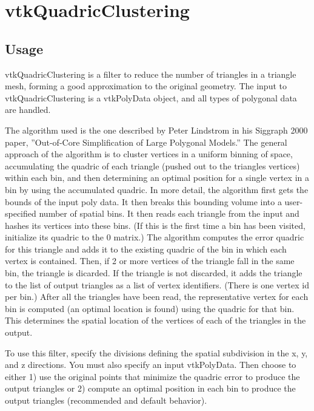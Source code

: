 \section{vtkQuadricClustering}

\subsection{Usage}

 vtkQuadricClustering is a filter to reduce the number of triangles in a
 triangle mesh, forming a good approximation to the original geometry.  The
 input to vtkQuadricClustering is a vtkPolyData object, and all types of
 polygonal data are handled.

 The algorithm used is the one described by Peter Lindstrom in his Siggraph
 2000 paper, ''Out-of-Core Simplification of Large Polygonal Models.''  The
 general approach of the algorithm is to cluster vertices in a uniform
 binning of space, accumulating the quadric of each triangle (pushed out to
 the triangles vertices) within each bin, and then determining an optimal
 position for a single vertex in a bin by using the accumulated quadric. In
 more detail, the algorithm first gets the bounds of the input poly data.
 It then breaks this bounding volume into a user-specified number of
 spatial bins.  It then reads each triangle from the input and hashes its
 vertices into these bins.  (If this is the first time a bin has been
 visited, initialize its quadric to the 0 matrix.) The algorithm computes
 the error quadric for this triangle and adds it to the existing quadric of
 the bin in which each vertex is contained. Then, if 2 or more vertices of
 the triangle fall in the same bin, the triangle is dicarded.  If the
 triangle is not discarded, it adds the triangle to the list of output
 triangles as a list of vertex identifiers.  (There is one vertex id per
 bin.)  After all the triangles have been read, the representative vertex
 for each bin is computed (an optimal location is found) using the quadric
 for that bin.  This determines the spatial location of the vertices of
 each of the triangles in the output.

 To use this filter, specify the divisions defining the spatial subdivision
 in the x, y, and z directions. You must also specify an input vtkPolyData.
 Then choose to either 1) use the original points that minimize the quadric
 error to produce the output triangles or 2) compute an optimal position in
 each bin to produce the output triangles (recommended and default behavior).

